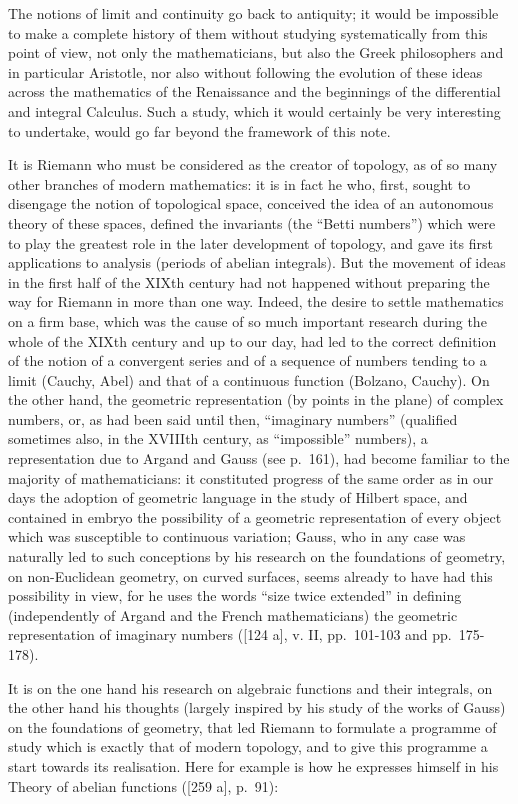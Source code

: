 The notions of limit and continuity go back to antiquity; it would be impossible to make a complete history of them without studying systematically from this point of view, not only the mathematicians, but also the Greek philosophers and in particular Aristotle, nor also without following the evolution of these ideas across the mathematics of the Renaissance and the beginnings of the differential and integral Calculus. Such a study, which it would certainly be very interesting to undertake, would go far beyond the framework of this note.

It is Riemann who must be considered as the creator of topology, as of so many other branches of modern mathematics: it is in fact he who, first, sought to disengage the notion of topological space, conceived the idea of an autonomous theory of these spaces, defined the invariants (the ``Betti numbers'') which were to play the greatest role in the later development of topology, and gave its first applications to analysis (periods of abelian integrals). But the movement of ideas in the first half of the XIXth century had not happened without preparing the way for Riemann in more than one way. Indeed, the desire to settle mathematics on a firm base, which was the cause of so much important research during the whole of the XIXth century and up to our day, had led to the correct definition of the notion of a convergent series and of a sequence of numbers tending to a limit (Cauchy, Abel) and that of a continuous function (Bolzano, Cauchy). On the other hand, the geometric representation (by points in the plane) of complex numbers, or, as had been said until then, ``imaginary numbers'' (qualified sometimes also, in the XVIIIth century, as ``impossible'' numbers), a representation due to Argand and Gauss (see p.~161), had become familiar to the majority of mathematicians: it constituted progress of the same order as in our days the adoption of geometric language in the study of Hilbert space, and contained in embryo the possibility of a geometric representation of every object which was susceptible to continuous variation; Gauss, who in any case was naturally led to such conceptions by his research on the foundations of geometry, on non-Euclidean geometry, on curved surfaces, seems already to have had this possibility in view, for he uses the words ``size twice extended'' in defining (independently of Argand and the French mathematicians) the geometric representation of imaginary numbers ({[}124 a{]}, v. II, pp.~101-103 and pp.~175-178).

It is on the one hand his research on algebraic functions and their integrals, on the other hand his thoughts (largely inspired by his study of the works of Gauss) on the foundations of geometry, that led Riemann to formulate a programme of study which is exactly that of modern topology, and to give this programme a start towards its realisation. Here for example is how he expresses himself in his Theory of abelian functions ({[}259 a{]}, p.~91):

